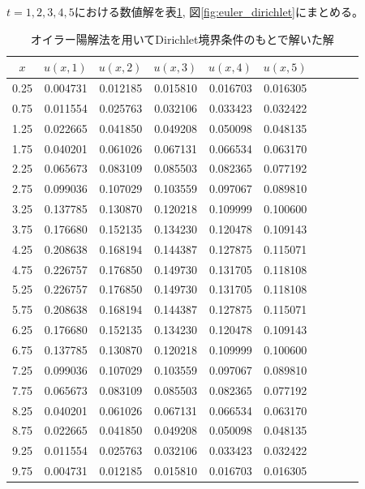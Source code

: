 \documentclass[a4j, titlepage]{jsarticle}
\numberwithin{equation}{section}
\begin{document}
            $t = 1, 2, 3, 4, 5$における数値解を表\ref{tab:euler_dirichlet}, 図\ref{fig:euler_dirichlet}にまとめる。
            \begin{table}[h]
                \centering
                \caption{オイラー陽解法を用いてDirichlet境界条件のもとで解いた解}
                \label{tab:euler_dirichlet}
                \begin{tabular}{crrrrcrrrr}
                    \hline
                    $x$ & $u(x, 1)$ & $u(x, 2)$ & $u(x, 3)$ & $u(x, 4)$ & $u(x, 5)$
                    \\
                    \hline
                    \hline
                    0.25 & 0.004731 & 0.012185 & 0.015810 & 0.016703 & 0.016305 \\
                    0.75 & 0.011554 & 0.025763 & 0.032106 & 0.033423 & 0.032422 \\
                    1.25 & 0.022665 & 0.041850 & 0.049208 & 0.050098 & 0.048135 \\
                    1.75 & 0.040201 & 0.061026 & 0.067131 & 0.066534 & 0.063170 \\
                    2.25 & 0.065673 & 0.083109 & 0.085503 & 0.082365 & 0.077192 \\
                    2.75 & 0.099036 & 0.107029 & 0.103559 & 0.097067 & 0.089810 \\
                    3.25 & 0.137785 & 0.130870 & 0.120218 & 0.109999 & 0.100600 \\
                    3.75 & 0.176680 & 0.152135 & 0.134230 & 0.120478 & 0.109143 \\
                    4.25 & 0.208638 & 0.168194 & 0.144387 & 0.127875 & 0.115071 \\
                    4.75 & 0.226757 & 0.176850 & 0.149730 & 0.131705 & 0.118108 \\
                    5.25 & 0.226757 & 0.176850 & 0.149730 & 0.131705 & 0.118108 \\
                    5.75 & 0.208638 & 0.168194 & 0.144387 & 0.127875 & 0.115071 \\
                    6.25 & 0.176680 & 0.152135 & 0.134230 & 0.120478 & 0.109143 \\
                    6.75 & 0.137785 & 0.130870 & 0.120218 & 0.109999 & 0.100600 \\
                    7.25 & 0.099036 & 0.107029 & 0.103559 & 0.097067 & 0.089810 \\
                    7.75 & 0.065673 & 0.083109 & 0.085503 & 0.082365 & 0.077192 \\
                    8.25 & 0.040201 & 0.061026 & 0.067131 & 0.066534 & 0.063170 \\
                    8.75 & 0.022665 & 0.041850 & 0.049208 & 0.050098 & 0.048135 \\
                    9.25 & 0.011554 & 0.025763 & 0.032106 & 0.033423 & 0.032422 \\
                    9.75 & 0.004731 & 0.012185 & 0.015810 & 0.016703 & 0.016305 \\
                    \hline																	
                \end{tabular}
            \end{table}
\end{document}
